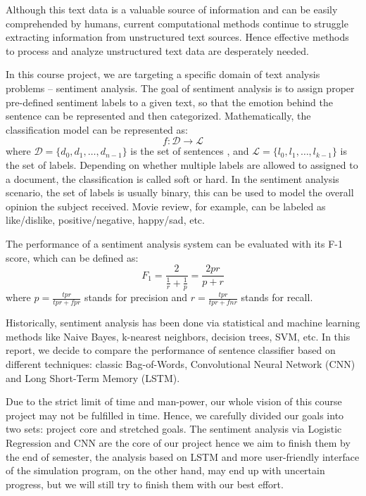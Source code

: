 \documentclass[conference]{IEEEtran}
\begin{document}
    Although this text data is a valuable source of information
    and can be easily comprehended by humans, current computational methods
    continue to struggle extracting information from unstructured text 
    sources\cite{mitchell2015}.
    Hence effective methods to process and analyze unstructured text data are
    desperately needed.

    In this course project, we are targeting a specific domain of text analysis
    problems -- sentiment analysis. The goal of sentiment analysis is to assign
    proper pre-defined sentiment labels to a given text, so that the emotion behind the
    sentence can be represented and then categorized\cite{allahyari2017brief}.
    Mathematically, the classification model can be represented as:
    $$f:\mathcal{D}\rightarrow\mathcal{L}$$
    where $\mathcal{D}=\{d_0, d_1,\ldots, d_{n-1}\}$ is the set of sentences
    , and $\mathcal{L}=\{l_0, l_1,\ldots, l_{k-1}\}$ is the set of labels.
    Depending on whether multiple labels are allowed to assigned to a document, the
    classification is called soft or hard\cite{gopal2010multilabel}. In the sentiment 
    analysis scenario, the set of labels is usually binary, this can be used
    to model the overall opinion the subject received. Movie review, for example,
    can be labeled as like/dislike, positive/negative, happy/sad, etc.
    \cite{pang2002thumbs}

    The performance of a sentiment analysis system can be evaluated with its
    F-1 score, which can be defined as\cite{forman2003extensive}:
    $$F_1=\frac{2}{\frac{1}{r}+\frac{1}{p}}=\frac{2pr}{p+r}$$
    where $p=\frac{tpr}{tpr+fpr}$ stands for precision and $r=\frac{tpr}{tpr+fnr}$
    stands for recall.

    Historically, sentiment analysis has been done via statistical
    and machine learning methods like Naive Bayes, k-nearest neighbors, decision
    trees, SVM, etc. In this report, we decide to compare the performance of
    sentence classifier based on different techniques: 
    classic Bag-of-Words\cite{pang2002thumbs},
    Convolutional Neural Network (CNN)\cite{kim2014convolutional} 
    and Long Short-Term Memory (LSTM)\cite{barnes2017assessing}.
    
    Due to the strict limit of time and man-power, our whole vision of this course 
    project may not be fulfilled in time. Hence, we carefully divided our goals into 
    two sets: project core and stretched goals. The sentiment analysis via 
    Logistic Regression and CNN are the core of our project hence we aim to 
    finish them by the end of semester, the analysis based on LSTM and more
    user-friendly interface of the simulation program, on the other hand,
    may end up with uncertain progress, but we will still try to finish them 
    with our best effort.
    
\end{document}
